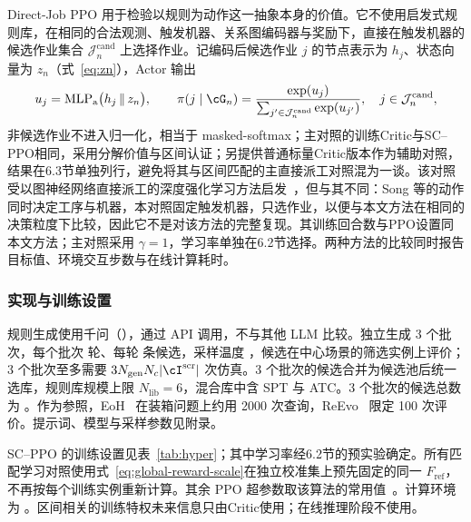Direct-Job PPO 用于检验以规则为动作这一抽象本身的价值。它不使用启发式规则库，在相同的合法观测、触发机器、关系图编码器与奖励下，直接在触发机器的候选作业集合 $\mathcal J_n^{\mathrm{cand}}$ 上选择作业。记编码后候选作业 $j$ 的节点表示为 $h_j$、状态向量为 $z_n$（式~\eqref{eq:zn}），Actor 输出
\[
  u_j=\mathrm{MLP}_{\mathrm{a}}\bigl(h_j\,\Vert\,z_n\bigr),\qquad
  \pi(j\mid\cG_n)=\frac{\exp(u_j)}{\sum_{j'\in\mathcal J_n^{\mathrm{cand}}}\exp(u_{j'})},\quad j\in\mathcal J_n^{\mathrm{cand}},
\]
非候选作业不进入归一化，相当于 masked-softmax；主对照的训练Critic与SC--PPO相同，采用分解价值与区间认证；另提供普通标量Critic版本作为辅助对照，结果在6.3节单独列行，避免将其与区间匹配的主直接派工对照混为一谈。该对照受以图神经网络直接派工的深度强化学习方法启发~\cite{song2023}，但与其不同：Song 等的动作同时决定工序与机器，本对照固定触发机器，只选作业，以便与本文方法在相同的决策粒度下比较，因此它不是对该方法的完整复现。其训练回合数与PPO设置同本文方法；主对照采用 $\gamma=1$，学习率单独在6.2节选择。两种方法的比较同时报告目标值、环境交互步数与在线计算耗时。

\subsubsection{实现与训练设置}

规则生成使用千问（\tbd[模型版本号与调用时间]），通过 API 调用，不与其他 LLM 比较。独立生成 3 个批次，每个批次  轮、每轮 \tbd[$N_c$] 条候选，采样温度 \tbd[※]，候选在中心场景的筛选实例上评价；3 个批次至多需要 $3N_{\mathrm{gen}}N_c|\cI^{\mathrm{scr}}|$ 次仿真。3 个批次的候选合并为候选池后统一选库，规则库规模上限 $N_{\mathrm{lib}}=6$，混合库中含 SPT 与 ATC。3 个批次的候选总数为 \tbd[※]。作为参照，EoH~\cite{liu2024eoh} 在装箱问题上约用 2000 次查询，ReEvo~\cite{ye2024reevo} 限定 100 次评价。提示词、模型与采样参数见附录。

SC--PPO 的训练设置见表~\ref{tab:hyper}；其中学习率经6.2节的预实验确定。所有匹配学习对照使用式~\eqref{eq:global-reward-scale}在独立校准集上预先固定的同一 $F_{\mathrm{ref}}$，不再按每个训练实例重新计算。其余 PPO 超参数取该算法的常用值~\cite{schulman2017ppo,schulman2016gae}。计算环境为 。区间相关的训练特权未来信息只由Critic使用；在线推理阶段不使用。

